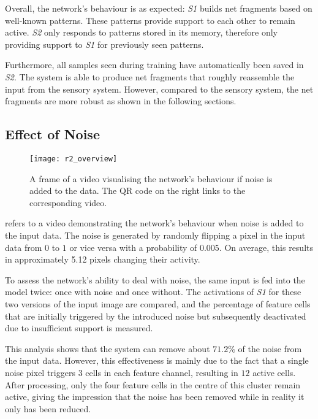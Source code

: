 Overall, the network's behaviour is as expected: \emph{S1} builds net fragments based on well-known patterns.
These patterns provide support to each other to remain active.
\emph{S2} only responds to patterns stored in its memory, therefore only providing support to \emph{S1} for previously seen patterns.

Furthermore, all samples seen during training have automatically been saved in \emph{S2}.
The system is able to produce net fragments that roughly reassemble the input from the sensory system.
However, compared to the sensory system, the net fragments are more robust as shown in the following sections.

\subsection{Effect of Noise}
%
\begin{figure}[h]
    \centering
    \texttt{[image: r2\_overview]}
    \caption[Video visualising the network's behaviour with noise in input]{A frame of a video visualising the network's behaviour if noise is added to the data. The QR code on the right links to the corresponding video.}
\end{figure}
%
 refers to a video demonstrating the network's behaviour when noise is added to the input data.
The noise is generated by randomly flipping a pixel in the input data from $0$ to $1$ or vice versa with a probability of 0.005. On average, this results in approximately 5.12 pixels changing their activity.

To assess the network's ability to deal with noise, the same input is fed into the model twice: once with noise and once without. The activations of \emph{S1} for these two versions of the input image are compared, and the percentage of feature cells that are initially triggered by the introduced noise but subsequently deactivated due to insufficient support is measured.


This analysis shows that the system can remove about $71.2\%$ of the noise from the input data. However, this effectiveness is mainly due to the fact that a single noise pixel triggers $3$ cells in each feature channel, resulting in $12$ active cells. After processing, only the four feature cells in the centre of this cluster remain active, giving the impression that the noise has been removed while in reality it only has been reduced.

